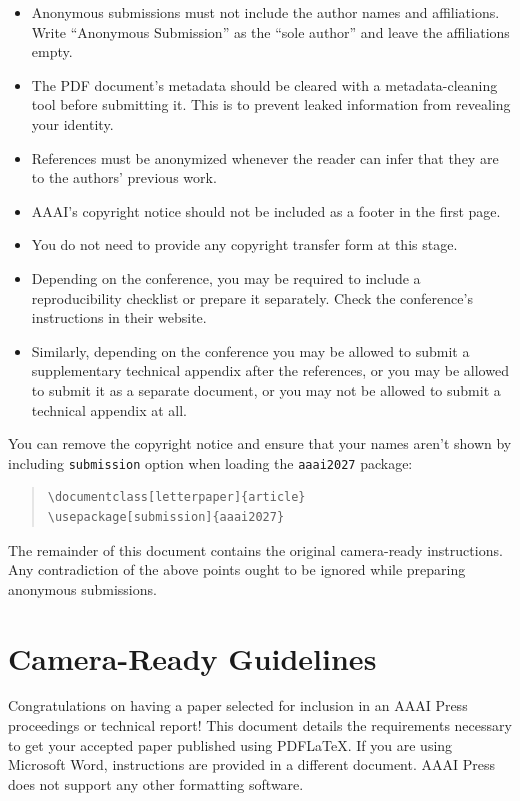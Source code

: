 \documentclass[letterpaper]{article} %
\begin{document}
\begin{itemize}
    \item Anonymous submissions must not include the author names and affiliations. Write ``Anonymous Submission'' as the ``sole author'' and leave the affiliations empty.
    \item The PDF document's metadata should be cleared with a metadata-cleaning tool before submitting it. This is to prevent leaked information from revealing your identity.
    \item References must be anonymized whenever the reader can infer that they are to the authors' previous work.
    \item AAAI's copyright notice should not be included as a footer in the first page.
    \item You do not need to provide any copyright transfer form at this stage.
    \item Depending on the conference, you may be required to include a reproducibility checklist or prepare it separately. Check the conference's instructions in their website.
    \item Similarly, depending on the conference you may be allowed to submit a supplementary technical appendix after the references, or you may be allowed to submit it as a separate document, or you may not be allowed to submit a technical appendix at all.
\end{itemize}

You can remove the copyright notice and ensure that your names aren't shown by including \texttt{submission} option when loading the \texttt{aaai2027} package:

\begin{quote}\begin{scriptsize}\begin{verbatim}
\documentclass[letterpaper]{article}
\usepackage[submission]{aaai2027}
\end{verbatim}\end{scriptsize}\end{quote}

The remainder of this document contains the original camera-ready instructions. Any contradiction of the above points ought to be ignored while preparing anonymous submissions.

\section{Camera-Ready Guidelines}

Congratulations on having a paper selected for inclusion in an AAAI Press proceedings or technical report! This document details the requirements necessary to get your accepted paper published using PDF\LaTeX{}. If you are using Microsoft Word, instructions are provided in a different document. AAAI Press does not support any other formatting software.
\end{document}
